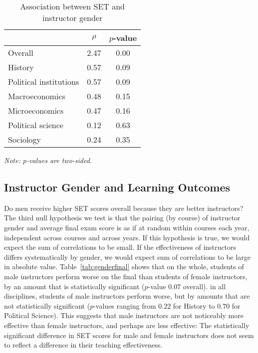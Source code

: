 \documentclass[12pt]{article}
\begin{document}
\begin{table}[htbp]
  \centering
  \footnotesize 
  \caption{Association between SET and instructor gender}
    \begin{tabular}{lcc}
    \toprule 
                          & $\rho$  & $p$-value     \\
   \midrule
    Overall &                 2.47       & 0.00     \\
    History &                 0.57       & 0.09     \\
    Political institutions &  0.57       & 0.09     \\
    Macroeconomics &          0.48       & 0.15     \\
    Microeconomics &          0.47       & 0.16     \\
    Political science &      0.12       & 0.63     \\
    Sociology &               0.24       & 0.35     \\
    \bottomrule
    \end{tabular}%
 \label{tab:instructorgender}%
  
  \textit{Note: $p$-values are two-sided.}
\end{table}%
\normalsize

\subsection{Instructor Gender and Learning Outcomes} \label{sec:Fr-gender-final}
Do men receive higher SET scores overall because they are better instructors? 
The third null hypothesis we test is that the pairing (by course) of instructor gender and
average final exam score is as if at random within courses each year, independent
across courses and across years.
If this hypothesis is true, we would expect the sum of correlations to be small.
If the effectiveness of instructors differs systematically by gender,
we would expect sum of correlations to be large in absolute value. 
Table~\ref{tab:genderfinal} shows that on the whole, students of male instructors
perform worse on the final than students of female instructors, by an amount that 
is statistically significant ($p$-value $0.07$ overall).
in all disciplines, students of male instructors perform worse, 
but by amounts that are not statistically significant ($p$-values ranging from $0.22$ for History to $0.70$ for Political Science).
This suggests that male instructors are not noticeably more effective than female instructors, 
and perhaps are less effective:
The statistically significant difference in SET scores for male and female instructors
does not seem to reflect a difference in their teaching effectiveness.
\end{document}
